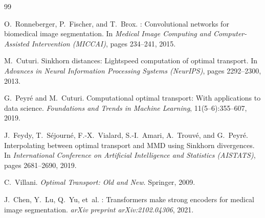 \documentclass[11pt,a4paper]{article}
\theoremstyle{definition}
\begin{document}
\begin{thebibliography}{99}

O.~Ronneberger, P.~Fischer, and T.~Brox.
: Convolutional networks for biomedical image segmentation.
\newblock In \textit{Medical Image Computing and Computer-Assisted Intervention
  (MICCAI)}, pages 234--241, 2015.

M.~Cuturi.
\newblock Sinkhorn distances: Lightspeed computation of optimal transport.
\newblock In \textit{Advances in Neural Information Processing Systems
  (NeurIPS)}, pages 2292--2300, 2013.

G.~Peyr\'e and M.~Cuturi.
\newblock Computational optimal transport: With applications to data science.
\newblock \textit{Foundations and Trends in Machine Learning},
  11(5--6):355--607, 2019.

J.~Feydy, T.~S\'ejourn\'e, F.-X.~Vialard, S.-I.~Amari, A.~Trouv\'e,
  and G.~Peyr\'e.
\newblock Interpolating between optimal transport and {MMD} using {Sinkhorn}
  divergences.
\newblock In \textit{International Conference on Artificial Intelligence and
  Statistics (AISTATS)}, pages 2681--2690, 2019.

C.~Villani.
\newblock \textit{Optimal Transport: Old and New}.
\newblock Springer, 2009.

J.~Chen, Y.~Lu, Q.~Yu, et~al.
: Transformers make strong encoders for medical image
  segmentation.
\newblock \textit{arXiv preprint arXiv:2102.04306}, 2021.

\end{thebibliography}
\end{document}
